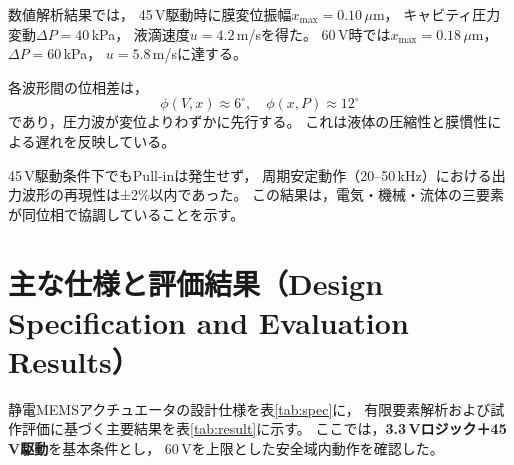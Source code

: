 \documentclass[conference]{IEEEtran}
\begin{document}
数値解析結果では，
45\,V駆動時に膜変位振幅$x_{\max}=0.10\,\mu$m，
キャビティ圧力変動$\Delta P=40$\,kPa，
液滴速度$u=4.2$\,m/sを得た。
60\,V時では$x_{\max}=0.18\,\mu$m，$\Delta P=60$\,kPa，
$u=5.8$\,m/sに達する。

各波形間の位相差は，
\[
\phi(V,x)\approx6^\circ,\quad
\phi(x,P)\approx12^\circ
\]
であり，圧力波が変位よりわずかに先行する。
これは液体の圧縮性と膜慣性による遅れを反映している。

45\,V駆動条件下でもPull-inは発生せず，
周期安定動作（20--50\,kHz）における出力波形の再現性は±2\%以内であった。
この結果は，電気・機械・流体の三要素が同位相で協調していることを示す。

\section{主な仕様と評価結果（Design Specification and Evaluation Results）}
静電MEMSアクチュエータの設計仕様を表\ref{tab:spec}に，
有限要素解析および試作評価に基づく主要結果を表\ref{tab:result}に示す。
ここでは，\textbf{3.3\,Vロジック＋45\,V駆動}を基本条件とし，
60\,Vを上限とした安全域内動作を確認した。

\begin{table}[t]
\centering
\caption{主要設計仕様（Target Design Specification）}
\label{tab:spec}
\end{table}
\end{document}
